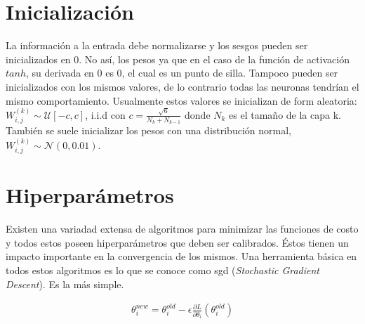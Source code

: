 \section{Inicialización}

\indent La información a la entrada debe normalizarse y los sesgos pueden ser inicializados en 0. No así, los pesos ya que en el caso de la función de activación $tanh$, su derivada en 0 es 0, el cual es un punto de silla. Tampoco pueden ser inicializados con los mismos valores, de lo contrario todas las neuronas tendrían el mismo comportamiento. Usualmente estos valores se inicializan de form aleatoria: $W_{i,j}^{(k)} \sim \mathcal{U}[-c,c]$, i.i.d con $c=\frac{\sqrt{6}}{N_k+N_{k-1}}$ donde $N_k$ es el tamaño de la capa k. También se suele inicializar los pesos con una distribución normal, $W_{i,j}^{(k)} \sim \mathcal{N}(0,0.01)$. 

\section{Hiperparámetros}

\indent Existen una variadad extensa de algoritmos para minimizar las funciones de costo y todos estos poseen hiperparámetros que deben ser calibrados. Éstos tienen un impacto importante en la convergencia de los mismos. Una herramienta básica en todos estos algoritmos es lo que se conoce como \acrshort{sgd} (\textit{Stochastic Gradient Descent}). Es la más simple.

\begin{align}
    \theta_i^{new} = \theta_i^{old}-\epsilon \frac{\partial L}{\partial \theta_i}(\theta_i^{old})
\end{align}

